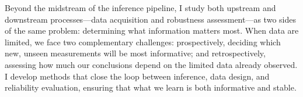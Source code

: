 




Beyond the midstream of the inference pipeline, I study both upstream and downstream processes—data acquisition and robustness assessment—as two sides of the same problem: determining what information matters most. When data are limited, we face two complementary challenges: prospectively, deciding which new, unseen measurements will be most informative; and retrospectively, assessing how much our conclusions depend on the limited data already observed. I develop methods that close the loop between inference, data design, and reliability evaluation, ensuring that what we learn is both informative and stable.
